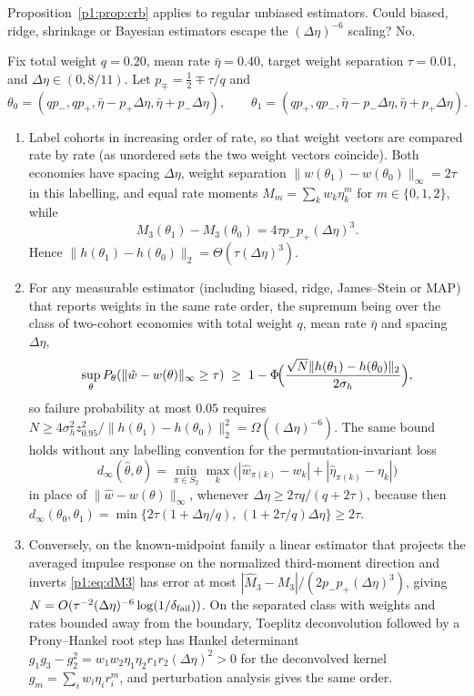 Proposition~\ref{p1:prop:crb} applies to regular unbiased estimators. Could biased, ridge, shrinkage or Bayesian estimators escape the $(\Delta\eta)^{-6}$ scaling? No.

\begin{theorem}[Global two-point bound and matching upper bound, $K=2$]\label{p1:thm:twocohort}
Fix total weight $q=0.20$, mean rate $\bar\eta=0.40$, target weight separation $\tau=0.01$, and $\Delta\eta\in(0,8/11)$. Let $p_\mp=\tfrac12\mp\tau/q$ and
\begin{equation}\label{p1:eq:pair}
\theta_0=(qp_-,qp_+,\bar\eta-p_+\Delta\eta,\bar\eta+p_-\Delta\eta),\qquad\theta_1=(qp_+,qp_-,\bar\eta-p_-\Delta\eta,\bar\eta+p_+\Delta\eta).
\end{equation}
\begin{enumerate}[label=(\roman*)]
\item Label cohorts in increasing order of rate, so that weight vectors are compared rate by rate (as unordered sets the two weight vectors coincide). Both economies have spacing $\Delta\eta$, weight separation $\|w(\theta_1)-w(\theta_0)\|_\infty=2\tau$ in this labelling, and equal rate moments $M_m=\sum_kw_k\eta_k^m$ for $m\in\{0,1,2\}$, while
\begin{equation}\label{p1:eq:dM3}
M_3(\theta_1)-M_3(\theta_0)=4\tau p_-p_+(\Delta\eta)^3 .
\end{equation}
Hence $\|h(\theta_1)-h(\theta_0)\|_2=\Theta(\tau(\Delta\eta)^3)$.
\item For any measurable estimator (including biased, ridge, James--Stein or MAP) that reports weights in the same rate order, the supremum being over the class of two-cohort economies with total weight $q$, mean rate $\bar\eta$ and spacing $\Delta\eta$,
\begin{equation}\label{p1:eq:lecam2}
\sup_\theta P_\theta(\|\hat w-w(\theta)\|_\infty\ge\tau)\;\ge\;1-\Phi\!\Bigl(\frac{\sqrt N\|h(\theta_1)-h(\theta_0)\|_2}{2\sigma_h}\Bigr),
\end{equation}
so failure probability at most $0.05$ requires $N\ge4\sigma_h^2z_{0.95}^2/\|h(\theta_1)-h(\theta_0)\|_2^2=\Omega((\Delta\eta)^{-6})$. The same bound holds without any labelling convention for the permutation-invariant loss
\[
d_\infty(\hat\theta,\theta)=\min_{\pi\in S_2}\max_{k}\bigl(|\hat w_{\pi(k)}-w_k|+|\hat\eta_{\pi(k)}-\eta_k|\bigr)
\]
in place of $\|\hat w-w(\theta)\|_\infty$, whenever $\Delta\eta\ge2\tau q/(q+2\tau)$, because then $d_\infty(\theta_0,\theta_1)=\min\{2\tau(1+\Delta\eta/q),\,(1+2\tau/q)\Delta\eta\}\ge2\tau$.
\item Conversely, on the known-midpoint family a linear estimator that projects the averaged impulse response on the normalized third-moment direction and inverts \eqref{p1:eq:dM3} has error at most $|\hat M_3-M_3|/(2p_-p_+(\Delta\eta)^3)$, giving $N=O(\tau^{-2}(\Delta\eta)^{-6}\log(1/\delta_{\rm fail}))$. On the separated class with weights and rates bounded away from the boundary, Toeplitz deconvolution followed by a Prony--Hankel root step has Hankel determinant $g_1g_3-g_2^2=w_1w_2\eta_1\eta_2r_1r_2(\Delta\eta)^2>0$ for the deconvolved kernel $g_m=\sum_iw_i\eta_ir_i^m$, and perturbation analysis gives the same order.

\end{enumerate}
\end{theorem}

